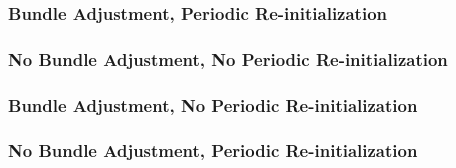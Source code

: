 \documentclass[11pt]{article}
\begin{document}
\subsubsection{Bundle Adjustment, Periodic Re-initialization}

\subsubsection{No Bundle Adjustment, No Periodic Re-initialization}

\subsubsection{Bundle Adjustment, No Periodic Re-initialization}

\subsubsection{No Bundle Adjustment, Periodic Re-initialization}
\end{document}
